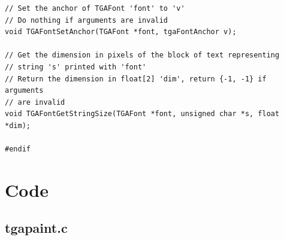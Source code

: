 \documentclass[12pt, a4paper]{article}
\begin{document}
\begin{scriptsize}
\begin{ttfamily}
\begin{lstlisting}
// Set the anchor of TGAFont 'font' to 'v'
// Do nothing if arguments are invalid
void TGAFontSetAnchor(TGAFont *font, tgaFontAnchor v);

// Get the dimension in pixels of the block of text representing 
// string 's' printed with 'font'
// Return the dimension in float[2] 'dim', return {-1, -1} if arguments
// are invalid
void TGAFontGetStringSize(TGAFont *font, unsigned char *s, float *dim);

#endif
\end{lstlisting}
\end{ttfamily}
\end{scriptsize}

\section{Code}

\subsection{tgapaint.c}
\end{document}

